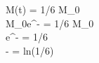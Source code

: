 M(t) = 1/6 \hspace{0.1cm} M_0
\\
M_0e^{-} = 1/6 \hspace{0.1cm} M_0
\\
e^{-} = 1/6 \hspace{0.1cm}
\\
{-} = ln(1/6)
